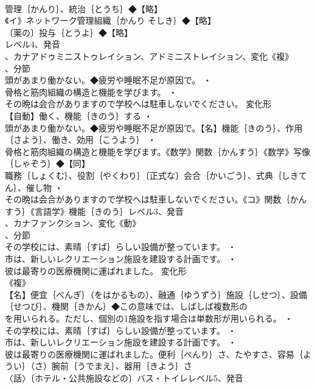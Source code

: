 \documentclass[8pt]{extreport}
\begin{document}
\begin{CJK}{UTF8}{min}
\\	管理｛かんり｝、統治｛とうち｝◆【略】
\\	《イ》ネットワーク管理組織｛かんり そしき｝◆【略】
\\	〔薬の〕投与｛とうよ｝◆【略】
\\	レベル4、発音
\\	、カナアドゥミニストゥレイション、アドミニストレイション、変化《複》
\\	、分節
\\	頭があまり働かない。◆疲労や睡眠不足が原因で。 ・
\\	骨格と筋肉組織の構造と機能を学びます。 ・
\\	その晩は会合がありますので学校へは駐車しないでください。	変化形 
\\	【自動】働く、機能｛きのう｝する ・
\\	頭があまり働かない。◆疲労や睡眠不足が原因で。【名】機能｛きのう｝、作用｛さよう｝、働き、効用｛こうよう｝ ・
\\	骨格と筋肉組織の構造と機能を学びます。《数学》関数｛かんすう｝《数学》写像｛しゃぞう｝◆【同】
\\	職務｛しょくむ｝、役割｛やくわり｝〔正式な〕会合｛かいごう｝、式典｛しきてん｝、催し物 ・
\\	その晩は会合がありますので学校へは駐車しないでください。《コ》関数｛かんすう｝《言語学》機能｛きのう｝レベル3、発音
\\	、カナファンクション、変化《動》
\\	、分節
\\	その学校には、素晴｛すば｝らしい設備が整っています。 ・
\\	市は、新しいレクリエーション施設を建設する計画です。 ・
\\	彼は最寄りの医療機関に運ばれました。	変化形 
\\	《複》
\\	【名】便宜｛べんぎ｝（をはかるもの）、融通｛ゆうずう｝施設｛しせつ｝、設備｛せつび｝、機関｛きかん｝◆この意味では、しばしば複数形の
\\	を用いられる。ただし、個別の1施設を指す場合は単数形が用いられる。 ・
\\	その学校には、素晴｛すば｝らしい設備が整っています。 ・
\\	市は、新しいレクリエーション施設を建設する計画です。 ・
\\	彼は最寄りの医療機関に運ばれました。便利｛べんり｝さ、たやすさ、容易｛ようい｝（さ）腕前｛うでまえ｝、器用｛きよう｝さ
\\	〈話〉〔ホテル・公共施設などの〕バス・トイレレベル5、発音

\end{CJK}
\end{document}
